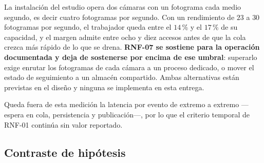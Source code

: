 La instalación del estudio opera dos cámaras con un fotograma cada medio segundo,
es decir cuatro fotogramas por segundo. Con un rendimiento de $23$ a $30$
fotogramas por segundo, el trabajador queda entre el $14$\,\% y el $17$\,\% de su
capacidad, y el margen admite entre ocho y diez accesos antes de que la cola crezca
más rápido de lo que se drena. \textbf{RNF-07 se sostiene para la operación
documentada y deja de sostenerse por encima de ese umbral}: superarlo exige
enrutar los fotogramas de cada cámara a un proceso dedicado, o mover el estado de
seguimiento a un almacén compartido. Ambas alternativas están previstas en el
diseño y ninguna se implementa en esta entrega.

Queda fuera de esta medición la latencia por evento de extremo a extremo ---espera
en cola, persistencia y publicación---, por lo que el criterio temporal de RNF-01
continúa sin valor reportado.

\subsection{Contraste de hipótesis}

